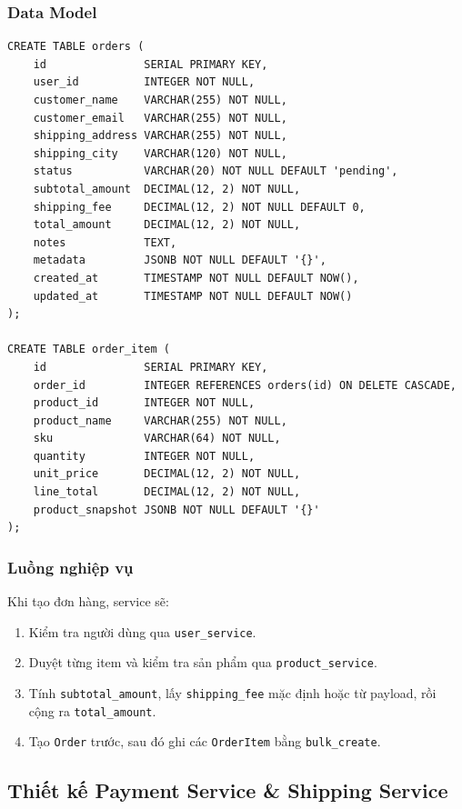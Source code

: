 \documentclass[12pt,a4paper]{article}
\begin{document}
\subsubsection{Data Model}
\begin{lstlisting}[style=code,caption={Data model rút gọn của Order Service}]
CREATE TABLE orders (
    id               SERIAL PRIMARY KEY,
    user_id          INTEGER NOT NULL,
    customer_name    VARCHAR(255) NOT NULL,
    customer_email   VARCHAR(255) NOT NULL,
    shipping_address VARCHAR(255) NOT NULL,
    shipping_city    VARCHAR(120) NOT NULL,
    status           VARCHAR(20) NOT NULL DEFAULT 'pending',
    subtotal_amount  DECIMAL(12, 2) NOT NULL,
    shipping_fee     DECIMAL(12, 2) NOT NULL DEFAULT 0,
    total_amount     DECIMAL(12, 2) NOT NULL,
    notes            TEXT,
    metadata         JSONB NOT NULL DEFAULT '{}',
    created_at       TIMESTAMP NOT NULL DEFAULT NOW(),
    updated_at       TIMESTAMP NOT NULL DEFAULT NOW()
);

CREATE TABLE order_item (
    id               SERIAL PRIMARY KEY,
    order_id         INTEGER REFERENCES orders(id) ON DELETE CASCADE,
    product_id       INTEGER NOT NULL,
    product_name     VARCHAR(255) NOT NULL,
    sku              VARCHAR(64) NOT NULL,
    quantity         INTEGER NOT NULL,
    unit_price       DECIMAL(12, 2) NOT NULL,
    line_total       DECIMAL(12, 2) NOT NULL,
    product_snapshot JSONB NOT NULL DEFAULT '{}'
);
\end{lstlisting}

\subsubsection{Luồng nghiệp vụ}
Khi tạo đơn hàng, service sẽ:
\begin{enumerate}
  \item Kiểm tra người dùng qua \texttt{user\_service}.
  \item Duyệt từng item và kiểm tra sản phẩm qua \texttt{product\_service}.
  \item Tính \texttt{subtotal\_amount}, lấy \texttt{shipping\_fee} mặc định hoặc từ payload, rồi cộng ra \texttt{total\_amount}.
  \item Tạo \texttt{Order} trước, sau đó ghi các \texttt{OrderItem} bằng \texttt{bulk\_create}.
\end{enumerate}

\subsection{Thiết kế Payment Service \& Shipping Service}
\end{document}

